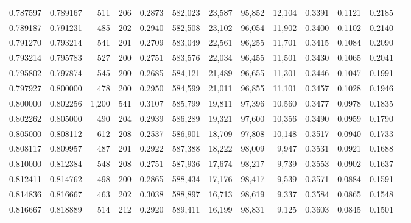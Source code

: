 \begin{tabular}{rrrrrrrrrrrrr}
0.787597 & 0.789167 &    511 &   206 &                                     0.2873 & 582,023 &  23,587 &  95,852 &  12,104 & 0.3391 & 0.1121 & 0.2185 \\
0.789187 & 0.791231 &    485 &   202 &                                     0.2940 & 582,508 &  23,102 &  96,054 &  11,902 & 0.3400 & 0.1102 & 0.2140 \\
0.791270 & 0.793214 &    541 &   201 &                                     0.2709 & 583,049 &  22,561 &  96,255 &  11,701 & 0.3415 & 0.1084 & 0.2090 \\
0.793214 & 0.795783 &    527 &   200 &                                     0.2751 & 583,576 &  22,034 &  96,455 &  11,501 & 0.3430 & 0.1065 & 0.2041 \\
0.795802 & 0.797874 &    545 &   200 &                                     0.2685 & 584,121 &  21,489 &  96,655 &  11,301 & 0.3446 & 0.1047 & 0.1991 \\
0.797927 & 0.800000 &    478 &   200 &                                     0.2950 & 584,599 &  21,011 &  96,855 &  11,101 & 0.3457 & 0.1028 & 0.1946 \\
0.800000 & 0.802256 &  1,200 &   541 &                                     0.3107 & 585,799 &  19,811 &  97,396 &  10,560 & 0.3477 & 0.0978 & 0.1835 \\
0.802262 & 0.805000 &    490 &   204 &                                     0.2939 & 586,289 &  19,321 &  97,600 &  10,356 & 0.3490 & 0.0959 & 0.1790 \\
0.805000 & 0.808112 &    612 &   208 &                                     0.2537 & 586,901 &  18,709 &  97,808 &  10,148 & 0.3517 & 0.0940 & 0.1733 \\
0.808117 & 0.809957 &    487 &   201 &                                     0.2922 & 587,388 &  18,222 &  98,009 &   9,947 & 0.3531 & 0.0921 & 0.1688 \\
0.810000 & 0.812384 &    548 &   208 &                                     0.2751 & 587,936 &  17,674 &  98,217 &   9,739 & 0.3553 & 0.0902 & 0.1637 \\
0.812411 & 0.814762 &    498 &   200 &                                     0.2865 & 588,434 &  17,176 &  98,417 &   9,539 & 0.3571 & 0.0884 & 0.1591 \\
0.814836 & 0.816667 &    463 &   202 &                                     0.3038 & 588,897 &  16,713 &  98,619 &   9,337 & 0.3584 & 0.0865 & 0.1548 \\
0.816667 & 0.818889 &    514 &   212 &                                     0.2920 & 589,411 &  16,199 &  98,831 &   9,125 & 0.3603 & 0.0845 & 0.1501 \\

\end{tabular}
